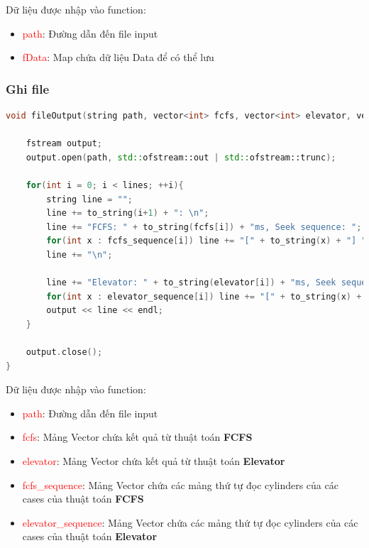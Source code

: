 \documentclass{report}
\begin{document}
                Dữ liệu được nhập vào function:
                \begin{itemize}
                    \item \textcolor{red}{path}: Đường dẫn đến file input
                    \item \textcolor{red}{fData}: Map chứa dữ liệu Data để có thể lưu
                \end{itemize}

            \subsubsection{Ghi file}
                \begin{lstlisting}[language=C++, caption = File writing (Output)]           
void fileOutput(string path, vector<int> fcfs, vector<int> elevator, vector<vector<int>> fcfs_sequence, vector<vector<int>> elevator_sequence){
    
    fstream output;
    output.open(path, std::ofstream::out | std::ofstream::trunc);

    for(int i = 0; i < lines; ++i){
        string line = "";
        line += to_string(i+1) + ": \n";
        line += "FCFS: " + to_string(fcfs[i]) + "ms, Seek sequence: ";
        for(int x : fcfs_sequence[i]) line += "[" + to_string(x) + "] ";
        line += "\n";
        
        line += "Elevator: " + to_string(elevator[i]) + "ms, Seek sequence: ";
        for(int x : elevator_sequence[i]) line += "[" + to_string(x) + "] ";
        output << line << endl;
    }

    output.close();
}
                \end{lstlisting}
                
                Dữ liệu được nhập vào function:
                \begin{itemize}
                    \item \textcolor{red}{path}: Đường dẫn đến file input
                    \item \textcolor{red}{fcfs}: Mảng Vector chứa kết quả từ thuật toán \textbf{FCFS}
                    \item \textcolor{red}{elevator}: Mảng Vector chứa kết quả từ thuật toán \textbf{Elevator}
                    \item \textcolor{red}{fcfs\_sequence}: Mảng Vector chứa các mảng thứ tự đọc cylinders của các cases của thuật toán \textbf{FCFS}
                    \item \textcolor{red}{elevator\_sequence}: Mảng Vector chứa các mảng thứ tự đọc cylinders của các cases của thuật toán \textbf{Elevator}
                \end{itemize}
\end{document}
